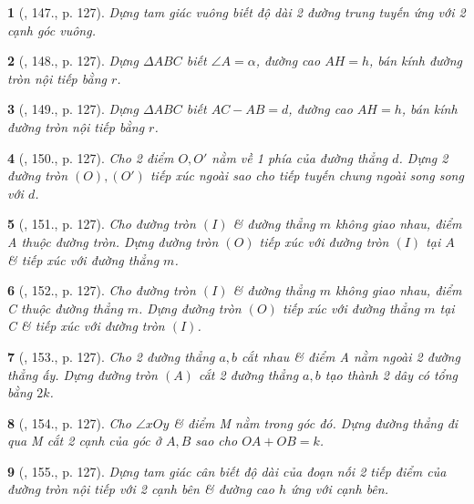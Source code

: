 \documentclass{article}
\newtheorem{baitoan}{}
\begin{document}
\begin{baitoan}[\cite{Binh_Toan_9_tap_1}, 147., p. 127]
	Dựng tam giác vuông biết độ dài 2 đường trung tuyến ứng với 2 cạnh góc vuông.
\end{baitoan}

\begin{baitoan}[\cite{Binh_Toan_9_tap_1}, 148., p. 127]
	Dựng $\Delta ABC$ biết $\angle{A} = \alpha$, đường cao $AH = h$, bán kính đường tròn nội tiếp bằng $r$.
\end{baitoan}

\begin{baitoan}[\cite{Binh_Toan_9_tap_1}, 149., p. 127]
	Dựng $\Delta ABC$ biết $AC - AB = d$, đường cao $AH = h$, bán kính đường tròn nội tiếp bằng $r$.
\end{baitoan}

\begin{baitoan}[\cite{Binh_Toan_9_tap_1}, 150., p. 127]
	Cho 2 điểm $O,O'$ nằm về 1 phía của đường thẳng $d$. Dựng 2 đường tròn $(O),(O')$ tiếp xúc ngoài sao cho tiếp tuyến chung ngoài song song với $d$.
\end{baitoan}

\begin{baitoan}[\cite{Binh_Toan_9_tap_1}, 151., p. 127]
	Cho đường tròn $(I)$ \& đường thẳng $m$ không giao nhau, điểm A thuộc đường tròn. Dựng đường tròn $(O)$ tiếp xúc với đường tròn $(I)$ tại $A$ \& tiếp xúc với đường thẳng $m$.
\end{baitoan}

\begin{baitoan}[\cite{Binh_Toan_9_tap_1}, 152., p. 127]
	Cho đường tròn $(I)$ \& đường thẳng $m$ không giao nhau, điểm C thuộc đường thẳng $m$. Dựng đường tròn $(O)$ tiếp xúc với đường thẳng $m$ tại C \& tiếp xúc với đường tròn $(I)$.
\end{baitoan}

\begin{baitoan}[\cite{Binh_Toan_9_tap_1}, 153., p. 127]
	Cho 2 đường thẳng $a,b$ cắt nhau \& điểm A nằm ngoài 2 đường thẳng ấy. Dựng đường tròn $(A)$ cắt 2 đường thẳng $a,b$ tạo thành 2 dây có tổng bằng $2k$.
\end{baitoan}

\begin{baitoan}[\cite{Binh_Toan_9_tap_1}, 154., p. 127]
	Cho $\angle{xOy}$ \& điểm M nằm trong góc đó. Dựng đường thẳng đi qua M cắt 2 cạnh của góc ở $A,B$ sao cho $OA + OB = k$.
\end{baitoan}

\begin{baitoan}[\cite{Binh_Toan_9_tap_1}, 155., p. 127]
	Dựng tam giác cân biết độ dài của đoạn nối 2 tiếp điểm của đường tròn nội tiếp với 2 cạnh bên \& đường cao $h$ ứng với cạnh bên.
\end{baitoan}
\end{document}
